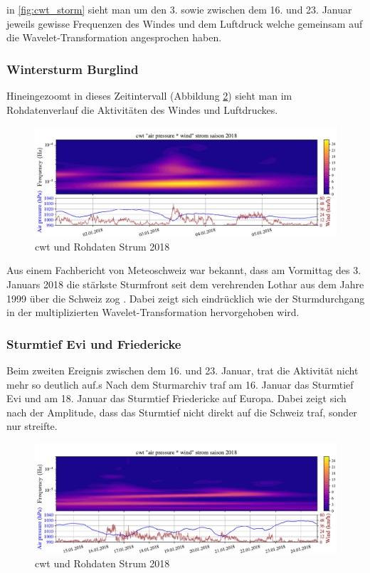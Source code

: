 \begin{refsection}
in \ref{fig:cwt_storm} \space sieht man um den 3. sowie zwischen dem 16. und 23. Januar jeweils gewisse Frequenzen des Windes und dem Luftdruck welche gemeinsam auf die Wavelet-Transformation angesprochen haben.

\subsubsection{Wintersturm Burglind}
Hineingezoomt in dieses Zeitintervall (Abbildung \ref{fig:cwt_storm_zoom}) sieht man im Rohdatenverlauf die Aktivitäten des Windes und Luftdruckes. 
\begin{figure}
	\centering
	\includegraphics[width=1\textwidth]{papers/wwt/images/storm_airp_wind_zoom.pdf}
	\caption{cwt und Rohdaten Strum 2018}
	\label{fig:cwt_storm_zoom}
\end{figure}
Aus einem Fachbericht von Meteoschweiz war bekannt, dass am Vormittag des 3. Januars 2018 die stärkste Sturmfront seit dem verehrenden Lothar aus dem Jahre 1999 über die Schweiz zog \cite{Fachbericht:Burglind}.
Dabei zeigt sich eindrücklich wie der Sturmdurchgang in der multiplizierten Wavelet-Transformation hervorgehoben wird.

\subsubsection{Sturmtief Evi und Friedericke }
Beim zweiten Ereignis zwischen dem 16. und 23. Januar, trat die Aktivität nicht mehr so deutlich auf.s
Nach dem Sturmarchiv\cite{online:sturmarchiv} traf am 16. Januar das Sturmtief Evi und am 18. Januar das Sturmtief Friedericke auf Europa. Dabei zeigt sich nach der Amplitude, dass das Sturmtief nicht direkt auf die Schweiz traf, sonder nur streifte. 

\begin{figure}[b]
	\centering
	\includegraphics[width=1\textwidth]{papers/wwt/images/storm_airp_wind_zoom2.pdf}
	\caption{cwt und Rohdaten Strum 2018}
	\label{fig:cwt_storm_zoom}
\end{figure}




\end{refsection}
